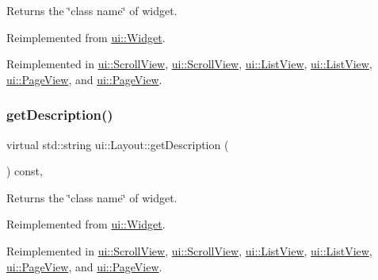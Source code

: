 Returns the \char`\"{}class name\char`\"{} of widget. 

Reimplemented from \hyperlink{classui_1_1Widget_ad85abdaa9133dc6b8efc32670ae9b93f}{ui\+::\+Widget}.



Reimplemented in \hyperlink{classui_1_1ScrollView_ac13041fae03618740ee778f8c3c6db7e}{ui\+::\+Scroll\+View}, \hyperlink{classui_1_1ScrollView_a3a808390a8d9162dbbf83d5211e87f2e}{ui\+::\+Scroll\+View}, \hyperlink{classui_1_1ListView_a921a755d9787f976af9424ceb16a1aa3}{ui\+::\+List\+View}, \hyperlink{classui_1_1ListView_a653bb454095ef227949f7c791b68180c}{ui\+::\+List\+View}, \hyperlink{classui_1_1PageView_aead0575c0e5d24da3731501afadf81e9}{ui\+::\+Page\+View}, and \hyperlink{classui_1_1PageView_a3c9b2934fdbbb44e2c456feee27b53de}{ui\+::\+Page\+View}.

\mbox{\label{classui_1_1Layout_abab3763418d0b11bb800c68aed425afd}} 
\subsubsection{\texorpdfstring{get\+Description()}{getDescription()}\hspace{0.1cm}{\footnotesize\ttfamily [2/2]}}
{\footnotesize\ttfamily virtual std\+::string ui\+::\+Layout\+::get\+Description (\begin{DoxyParamCaption}{ }\end{DoxyParamCaption}) const\hspace{0.3cm}{\ttfamily [override]}, {\ttfamily [virtual]}}

Returns the \char`\"{}class name\char`\"{} of widget. 

Reimplemented from \hyperlink{classui_1_1Widget_ad85abdaa9133dc6b8efc32670ae9b93f}{ui\+::\+Widget}.



Reimplemented in \hyperlink{classui_1_1ScrollView_ac13041fae03618740ee778f8c3c6db7e}{ui\+::\+Scroll\+View}, \hyperlink{classui_1_1ScrollView_a3a808390a8d9162dbbf83d5211e87f2e}{ui\+::\+Scroll\+View}, \hyperlink{classui_1_1ListView_a921a755d9787f976af9424ceb16a1aa3}{ui\+::\+List\+View}, \hyperlink{classui_1_1ListView_a653bb454095ef227949f7c791b68180c}{ui\+::\+List\+View}, \hyperlink{classui_1_1PageView_aead0575c0e5d24da3731501afadf81e9}{ui\+::\+Page\+View}, and \hyperlink{classui_1_1PageView_a3c9b2934fdbbb44e2c456feee27b53de}{ui\+::\+Page\+View}.

